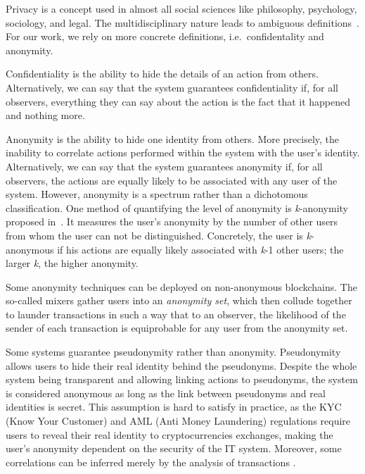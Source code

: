 \documentclass{ieeeaccess}
\begin{document}
Privacy is a concept used in almost all social sciences like philosophy, psychology, sociology, and legal. The multidisciplinary nature leads to ambiguous definitions~\cite{smithInformationPrivacyResearch2011}. For our work, we rely on more concrete definitions, i.e.~confidentality and anonymity.

Confidentiality is the ability to hide the details of an action from others. Alternatively, we can say that the system guarantees confidentiality if, for all observers, everything they can say about the action is the fact that it happened and nothing more.

Anonymity is the ability to hide one identity from others. More precisely, the inability to correlate actions performed within the system with the user's identity. Alternatively, we can say that the system guarantees anonymity if, for all observers, the actions are equally likely to be associated with any user of the system. However, anonymity is a spectrum rather than a dichotomous classification. One method of quantifying the level of anonymity is \textit{k}-anonymity proposed in~\cite{sweeneyKanonymityModelProtecting2002}. It measures the user's anonymity by the number of other users from whom the user can not be distinguished. Concretely, the user is \textit{k}-anonymous if his actions are equally likely associated with \textit{k}-1 other users; the larger \textit{k}, the higher anonymity.

Some anonymity techniques can be deployed on non-anonymous blockchains. The so-called mixers gather users into an \textit{anonymity set}, which then collude together to launder transactions in such a way that to an observer, the likelihood of the sender of each transaction is equiprobable for any user from the anonymity set.

Some systems guarantee pseudonymity rather than anonymity. Pseudonymity allows users to hide their real identity behind the pseudonyms. Despite the whole system being transparent and allowing linking actions to pseudonyms, the system is considered anonymous as long as the link between pseudonyms and real identities is secret. This assumption is hard to satisfy in practice, as the KYC (Know Your Customer) and AML (Anti Money Laundering) regulations require users to reveal their real identity to cryptocurrencies exchanges, making the user's anonymity dependent on the security of the IT system. Moreover, some correlations can be inferred merely by the analysis of transactions \cite{androulakiEvaluatingUserPrivacy2013, oberStructureAnonymityBitcoin2013}.
\end{document}

